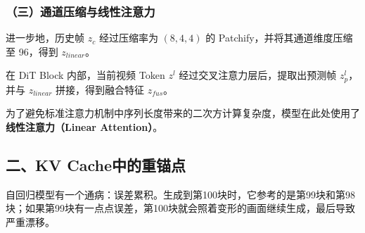 \hypertarget{ux4e09ux901aux9053ux538bux7f29ux4e0eux7ebfux6027ux6ce8ux610fux529b}{%
\subsubsection{（三）通道压缩与线性注意力}\label{ux4e09ux901aux9053ux538bux7f29ux4e0eux7ebfux6027ux6ce8ux610fux529b}}

进一步地，历史帧 \(z_c\) 经过压缩率为 \((8,4,4)\) 的 Patchify，并将其通道维度压缩至 96，得到 \(z_{linear}\)。

在 DiT Block 内部，当前视频 Token \(z^l\) 经过交叉注意力层后，提取出预测帧 \(z_p^l\)，并与 \(z_{linear}\) 拼接，得到融合特征 \(z_{fus}\)。

为了避免标准注意力机制中序列长度带来的二次方计算复杂度，模型在此处使用了\textbf{线性注意力（Linear Attention）}。

\hypertarget{ux4e8ckv-cacheux4e2dux7684ux91cdux951aux70b9}{%
\subsection{二、KV Cache中的重锚点}\label{ux4e8ckv-cacheux4e2dux7684ux91cdux951aux70b9}}

自回归模型有一个通病：误差累积。生成到第100块时，它参考的是第99块和第98块；如果第99块有一点点误差，第100块就会照着变形的画面继续生成，最后导致严重漂移。

